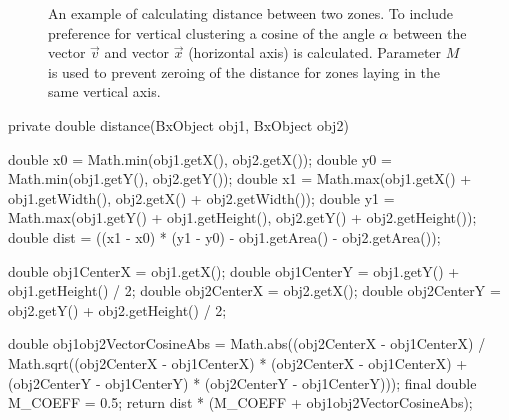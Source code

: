 \begin{figure}[ht!]
  \centering
  
  \caption{An example of calculating distance between two zones. To include preference for vertical clustering a cosine of the angle $\alpha$ between the vector $\vec{v}$ and vector $\vec{x}$ (horizontal axis) is calculated. Parameter $M$ is used to prevent zeroing of the distance for zones laying in the same vertical axis.}
  \label{fig:angle_alpha}
\end{figure}
\begin{code}[caption=Listing of the function measuring distance between two zones or zone groups.]

private double distance(BxObject obj1, BxObject obj2) {

    double x0 = Math.min(obj1.getX(), obj2.getX());
    double y0 = Math.min(obj1.getY(), obj2.getY());
    double x1 = Math.max(obj1.getX() + obj1.getWidth(),
            obj2.getX() + obj2.getWidth());
    double y1 = Math.max(obj1.getY() + obj1.getHeight(),
            obj2.getY() + obj2.getHeight());
    double dist = ((x1 - x0) * (y1 - y0) - obj1.getArea() - obj2.getArea());

    double obj1CenterX = obj1.getX();
    double obj1CenterY = obj1.getY() + obj1.getHeight() / 2;
    double obj2CenterX = obj2.getX();
    double obj2CenterY = obj2.getY() + obj2.getHeight() / 2;

    double obj1obj2VectorCosineAbs = Math.abs((obj2CenterX - obj1CenterX) / Math.sqrt((obj2CenterX - obj1CenterX) * (obj2CenterX - obj1CenterX) + (obj2CenterY - obj1CenterY) * (obj2CenterY - obj1CenterY)));
    final double M_COEFF = 0.5;
    return dist * (M_COEFF + obj1obj2VectorCosineAbs);
}
\end{code}
